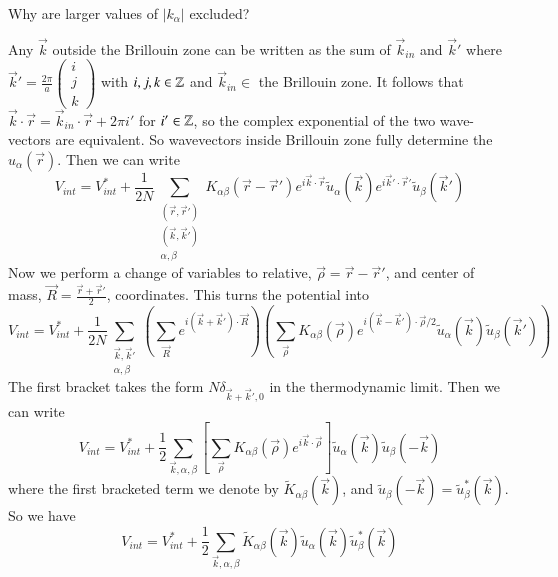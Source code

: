 \documentclass[12pt, a4paper, oneside, openright, titlepage]{book}
\begin{document}
\begin{qst}
    Why are larger values of $|k_{\alpha}|$ excluded?
\end{qst}
Any $\vec{k}$ outside the Brillouin zone can be written as the sum of $\vec{k}_{in}$ and $\vec{k}'$ where $\vec{k}' = \frac{2\pi}{a}\begin{pmatrix} i \\ j \\ k\end{pmatrix}$ with $i,j,k \in \mathbb Z$ and $\vec{k}_{in} \in$ the Brillouin zone. It follows that $\vec{k}\cdot\vec{r} = \vec{k}_{in}\cdot\vec{r} + 2\pi i'$ for $i' \in \mathbb Z$, so the complex exponential of the two wave-vectors are equivalent. So wavevectors inside Brillouin zone fully determine the $u_{\alpha}(\vec{r})$. Then we can write \begin{equation*}
    V_{int} = V_{int}^* + \frac{1}{2N}\sum_{\begin{array}{c} (\vec{r},\vec{r}') \\ (\vec{k},\vec{k}') \\ \alpha,\beta\end{array}} K_{\alpha\beta}(\vec{r}-\vec{r}')e^{i\vec{k}\cdot\vec{r}}\tilde{u}_{\alpha}(\vec{k})e^{i\vec{k}'\cdot\vec{r}'}\tilde{u}_{\beta}(\vec{k}')
\end{equation*}
Now we perform a change of variables to relative, $\vec{\rho} = \vec{r} - \vec{r}'$, and center of mass, $\vec{R} = \frac{\vec{r}+\vec{r}'}{2}$, coordinates. This turns the potential into \begin{equation*}
    V_{int} = V_{int}^* + \frac{1}{2N}\sum_{\begin{array}{c} \vec{k},\vec{k}' \\ \alpha,\beta \end{array}}\left(\sum_{\vec{R}}e^{i(\vec{k}+\vec{k}')\cdot\vec{R}}\right)\left(\sum_{\vec{\rho}}K_{\alpha\beta}(\vec{\rho})e^{i(\vec{k}-\vec{k}')\cdot\vec{\rho}/2}\tilde{u}_{\alpha}(\vec{k})\tilde{u}_{\beta}(\vec{k}')\right)
\end{equation*}
The first bracket takes the form $N\delta_{\vec{k}+\vec{k}',0}$ in the thermodynamic limit. Then we can write \begin{equation*}
    V_{int} = V_{int}^*+\frac{1}{2}\sum_{\vec{k},\alpha,\beta}\left[\sum_{\vec{\rho}}K_{\alpha\beta}(\vec{\rho})e^{i\vec{k}\cdot\vec{\rho}}\right]\tilde{u}_{\alpha}(\vec{k})\tilde{u}_{\beta}(-\vec{k})
\end{equation*}
where the first bracketed term we denote by $\tilde{K}_{\alpha\beta}(\vec{k})$, and $\tilde{u}_{\beta}(-\vec{k}) = \tilde{u}_{\beta}^*(\vec{k})$. So we have \begin{equation*}
    V_{int} = V_{int}^*+\frac{1}{2}\sum_{\vec{k},\alpha,\beta}\tilde{K}_{\alpha\beta}(\vec{k})\tilde{u}_{\alpha}(\vec{k})\tilde{u}_{\beta}^*(\vec{k})
\end{equation*}
\end{document}
